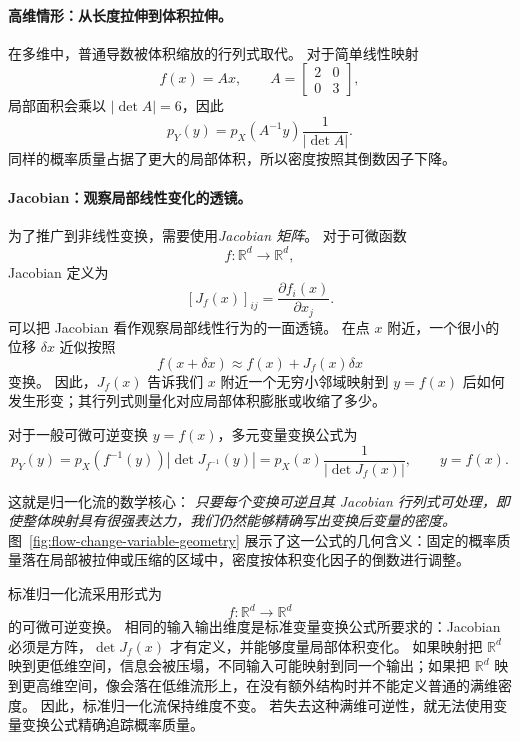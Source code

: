 \paragraph{高维情形：从长度拉伸到体积拉伸。}

在多维中，普通导数被体积缩放的行列式取代。
对于简单线性映射
\[
f(x)=Ax,
\qquad
A=
\begin{bmatrix}
2 & 0\\
0 & 3
\end{bmatrix},
\]
局部面积会乘以 $|\det A|=6$，因此
\[
p_Y(y)=p_X(A^{-1}y)\frac{1}{|\det A|}.
\]
同样的概率质量占据了更大的局部体积，所以密度按照其倒数因子下降。

\paragraph{Jacobian：观察局部线性变化的透镜。}

为了推广到非线性变换，需要使用\emph{Jacobian 矩阵}。
对于可微函数
\[
f:\mathbb{R}^d\to\mathbb{R}^d,
\]
Jacobian 定义为
\[
[J_f(x)]_{ij}
=
\frac{\partial f_i(x)}{\partial x_j}.
\]
可以把 Jacobian 看作观察局部线性行为的一面透镜。
在点 $x$ 附近，一个很小的位移 $\delta x$ 近似按照
\[
f(x+\delta x)
\approx
f(x)+J_f(x)\delta x
\]
变换。
因此，$J_f(x)$ 告诉我们 $x$ 附近一个无穷小邻域映射到 $y=f(x)$ 后如何发生形变；其行列式则量化对应局部体积膨胀或收缩了多少。

对于一般可微可逆变换 $y=f(x)$，多元变量变换公式为
\[
\boxed{
p_Y(y)
=
p_X(f^{-1}(y))
\left|
\det J_{f^{-1}}(y)
\right|
=
p_X(x)
\frac{1}{|\det J_f(x)|},
\qquad y=f(x).
}
\]

这就是归一化流的数学核心：
\emph{只要每个变换可逆且其 Jacobian 行列式可处理，即使整体映射具有很强表达力，我们仍然能够精确写出变换后变量的密度。}
图~\ref{fig:flow-change-variable-geometry} 展示了这一公式的几何含义：固定的概率质量落在局部被拉伸或压缩的区域中，密度按体积变化因子的倒数进行调整。



\begin{tcolorbox}[
  colback=blue!4,
  colframe=blue!50!black,
  title={为什么标准归一化流保持维度不变},
  boxrule=0.6pt,
  arc=2mm,
  left=2mm,
  right=2mm,
  top=1mm,
  bottom=1mm
]
标准归一化流采用形式为
\[
f:\mathbb{R}^d\to\mathbb{R}^d
\]
的可微可逆变换。
相同的输入输出维度是标准变量变换公式所要求的：Jacobian 必须是方阵，$\det J_f(x)$ 才有定义，并能够度量局部体积变化。
如果映射把 $\mathbb{R}^d$ 映到更低维空间，信息会被压塌，不同输入可能映射到同一个输出；如果把 $\mathbb{R}^d$ 映到更高维空间，像会落在低维流形上，在没有额外结构时并不能定义普通的满维密度。
因此，标准归一化流保持维度不变。
若失去这种满维可逆性，就无法使用变量变换公式精确追踪概率质量。
\end{tcolorbox}

